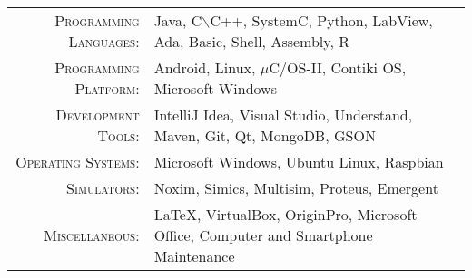 %
%
%

\renewcommand{\arraystretch}{1.1}

	\begin{tabular}{>{}r>{}p{13cm}} 
		\textsc{Programming Languages:}  		&   Java, C$\backslash$C++, SystemC, Python, LabView, Ada, Basic, Shell, Assembly, R\\ 
		\textsc{Programming Platform:}               	& Android, Linux, $\mu$C/OS-II, Contiki OS, Microsoft Windows\\ 
		\textsc{Development Tools:}	  		&   IntelliJ Idea, Visual Studio, Understand, Maven, Git, Qt, MongoDB, GSON\\
		\textsc{Operating Systems:}	        &   Microsoft Windows, Ubuntu Linux, Raspbian\\ 
        \textsc{Simulators:}				&   Noxim, Simics, Multisim, Proteus, Emergent\\
        \textsc{Miscellaneous:}				&   \LaTeX, VirtualBox, OriginPro, Microsoft Office, Computer and Smartphone Maintenance\\
	\end{tabular}